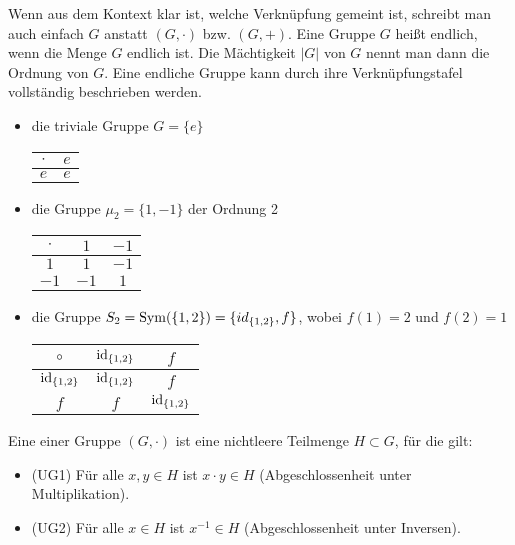 \begin{remark}
	Wenn aus dem Kontext klar ist, welche Verknüpfung gemeint ist, schreibt man auch einfach
	$G$ anstatt $(G, \cdot)$ bzw. $(G,+)$. Eine Gruppe $G$ heißt endlich, wenn die Menge $G$ endlich
	ist. Die Mächtigkeit $|G|$ von $G$ nennt man dann die Ordnung von $G$. Eine endliche Gruppe kann 
	durch ihre Verknüpfungstafel vollständig beschrieben werden.
\end{remark}

\begin{example}
	\begin{itemize}
		\item die triviale Gruppe $G=\{e\}$
		\begin{center}
			\begin{tabular}{|c|c|}
				\hline
				$\cdot$ & $e$\\
				\hline
				$e$ & $e$ \\
				\hline
			\end{tabular}
		\end{center}
		\item die Gruppe $\mu_2 = \{1,-1\}$ der Ordnung 2
		\begin{center}
			\begin{tabular}{|c|c|c|}
				\hline
				$\cdot$ & $1$ & $-1$\\
				\hline
				$1$ & $1$ & $-1$ \\
				\hline
				$-1$ & $-1$ & $1$ \\
				\hline
			\end{tabular}
		\end{center}
		\item die Gruppe $S_2= \operatorname{Sym}(\{1,2\}) = \{id_{\{1,2\}},f\}$, wobei $f(1)=2$ und $f(2)=1$
		\begin{center}
			\begin{tabular}{|c|c|c|}
				\hline
				$\circ$ & $\operatorname{id}_{\{1,2\}}$ & $f$\\
				\hline
				$\operatorname{id}_{\{1,2\}}$ & $\operatorname{id}_{\{1,2\}}$ & $f$ \\
				\hline
				$f$ & $f$ & $\operatorname{id}_{\{1,2\}}$ \\
				\hline
			\end{tabular}
		\end{center}
	\end{itemize}
\end{example}

\begin{definition}[Untergruppe]
	Eine  einer Gruppe $(G,\cdot)$ ist eine 
	nichtleere Teilmenge $H \subset G$, für die gilt:
	\begin{itemize}
		\item (UG1) Für alle $x,y \in H$ ist $x \cdot y \in H$ (Abgeschlossenheit unter Multiplikation).
		\item (UG2) Für alle $x \in H$ ist $x^{-1} \in H$ (Abgeschlossenheit unter Inversen).
	\end{itemize}
\end{definition}

